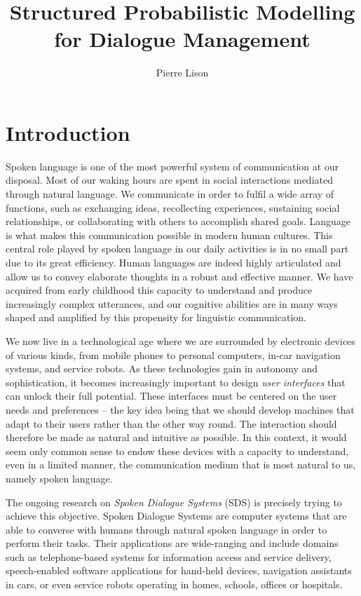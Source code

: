 \documentclass[english,12pt]{uiophd}
\title{Structured Probabilistic Modelling \\ for Dialogue Management}
\author{Pierre Lison}
\begin{document}
\frontmatter
\maketitle
\tableofcontents


\mainmatter

\chapter{Introduction}

Spoken language is one of the most powerful system of communication at our disposal. Most of our waking hours are spent in social interactions mediated through natural language.  We communicate in order to fulfil a wide array of functions, such as exchanging ideas, recollecting experiences,  sustaining social relationships, or collaborating with others to accomplish shared goals. Language is what makes this communication possible in modern human cultures.  This central role played by spoken language in our daily activities is in no small part due to its great efficiency.  Human languages are indeed highly articulated and allow us to convey elaborate thoughts in a robust and effective manner. We have acquired from early childhood this capacity to understand and produce increasingly complex utterances, and our cognitive abilities are in many ways shaped and amplified by this propensity for linguistic communication. 


We now live in a technological age where we are surrounded by electronic devices of various kinds, from mobile phones to personal computers, in-car navigation systems, and service robots. As these technologies gain in autonomy and sophistication, it becomes increasingly important to design \textit{user interfaces} that can unlock their full potential.  These interfaces must be centered on the user needs and preferences -- the key idea being that we should develop machines that adapt to their users rather than the other way round.  The interaction should therefore be made as natural and intuitive as possible. In this context, it would seem only common sense to endow these devices with a capacity to understand, even in a limited manner, the communication medium that is most natural to us, namely spoken language. 

The ongoing research on \textit{Spoken Dialogue Systems} (SDS) is precisely trying to achieve this objective. Spoken Dialogue Systems are computer systems that are able to converse with humans through natural spoken language in order to perform their tasks.  Their applications are wide-ranging and include domains such as telephone-based systems for information access and service delivery, speech-enabled software applications for hand-held devices, navigation assistants in cars, or even service robots operating in homes, schools, offices or hospitals.  
\end{document}
